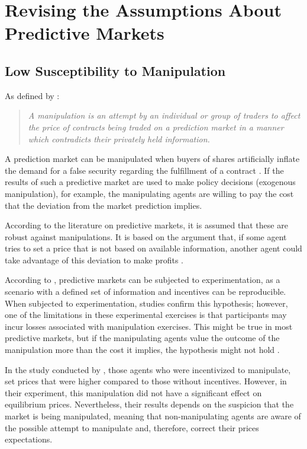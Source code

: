 \section{Revising the Assumptions About Predictive Markets}
\label{sec:revising_assumptions}

\subsection{Low Susceptibility to Manipulation}
\label{subsec:low_susceptibility_to_manipulation}

As defined by \cite{buckley2017effect}:
\begin{quote}
    \textit{A manipulation is an attempt by an individual or group of traders to affect the price of contracts being traded on a prediction market in a manner which contradicts their privately held information.}
\end{quote}
    
A prediction market can be manipulated when buyers of shares artificially inflate the demand for a false security regarding the fulfillment of a contract \parencite{choo2022manipulation}. If the results of such a predictive market are used to make policy decisions (exogenous manipulation), for example, the manipulating agents are willing to pay the cost that the deviation from the market prediction implies.
    
According to the literature on predictive markets, it is assumed that these are robust against manipulations. It is based on the argument that, if some agent tries to set a price that is not based on available information, another agent could take advantage of this deviation to make profits \parencite{buckley2017effect}.
    
According to \cite{HANSON2006449}, predictive markets can be subjected to experimentation, as a scenario with a defined set of information and incentives can be reproducible. When subjected to experimentation, studies confirm this hypothesis; however, one of the limitations in these experimental exercises is that participants may incur losses associated with manipulation exercises. This might be true in most predictive markets, but if the manipulating agents value the outcome of the manipulation more than the cost it implies, the hypothesis might not hold \parencite{deck2013affecting}.

In the study conducted by \citeauthor{HANSON2006449}, those agents who were incentivized to manipulate, set prices that were higher compared to those without incentives. However, in their experiment, this manipulation did not have a significant effect on equilibrium prices. Nevertheless, their results depends on the suspicion that the market is being manipulated, meaning that non-manipulating agents are aware of the possible attempt to manipulate and, therefore, correct their prices expectations.
    
